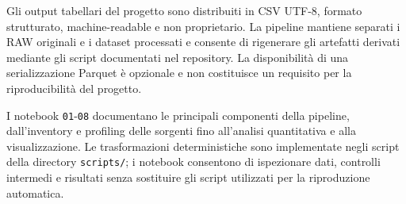 \documentclass[11pt,a4paper]{article}
\begin{document}
Gli output tabellari del progetto sono distribuiti in CSV UTF-8, formato strutturato, machine-readable e non proprietario. La pipeline mantiene separati i RAW originali e i dataset processati e consente di rigenerare gli artefatti derivati mediante gli script documentati nel repository. La disponibilità di una serializzazione Parquet è opzionale e non costituisce un requisito per la riproducibilità del progetto.

I notebook \texttt{01}-\texttt{08} documentano le principali componenti della pipeline, dall'inventory e profiling delle sorgenti fino all'analisi quantitativa e alla visualizzazione. Le trasformazioni deterministiche sono implementate negli script della directory \texttt{scripts/}; i notebook consentono di ispezionare dati, controlli intermedi e risultati senza sostituire gli script utilizzati per la riproduzione automatica.
\end{document}
